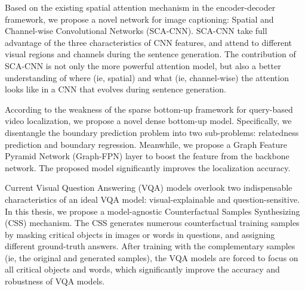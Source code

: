 \begin{englishabstract}
\begin{asparaenum}
\item Based on the existing spatial attention mechanism in the encoder-decoder framework, we propose a novel network for image captioning: Spatial and Channel-wise Convolutional Networks (SCA-CNN). SCA-CNN take full advantage of the three characteristics of CNN features, and attend to different visual regions and channels during the sentence generation. The contribution of SCA-CNN is not only the more powerful attention model, but also a better understanding of where (ie, spatial) and what (ie, channel-wise) the attention looks like in a CNN that evolves during sentence generation.

\item According to the weakness of the sparse bottom-up framework for query-based video localization, we propose a novel dense bottom-up model. Specifically, we disentangle the boundary prediction problem into two sub-problems: relatedness prediction and boundary regression. Meanwhile, we propose a Graph Feature Pyramid Network (Graph-FPN) layer to boost the feature from the backbone network. The proposed model significantly improves the localization accuracy.

\item Current Visual Question Answering (VQA) models overlook two indispensable characteristics of an ideal VQA model: visual-explainable and question-sensitive. In this thesis, we propose a model-agnostic Counterfactual Samples Synthesizing (CSS) mechanism. The CSS generates numerous counterfactual training samples by masking critical objects in images or words in questions, and assigning different ground-truth answers. After training with the complementary samples (ie, the original and generated samples), the VQA models are forced to focus on all critical objects and words, which significantly improve the accuracy and robustness of VQA models.
\end{asparaenum}


\end{englishabstract}
